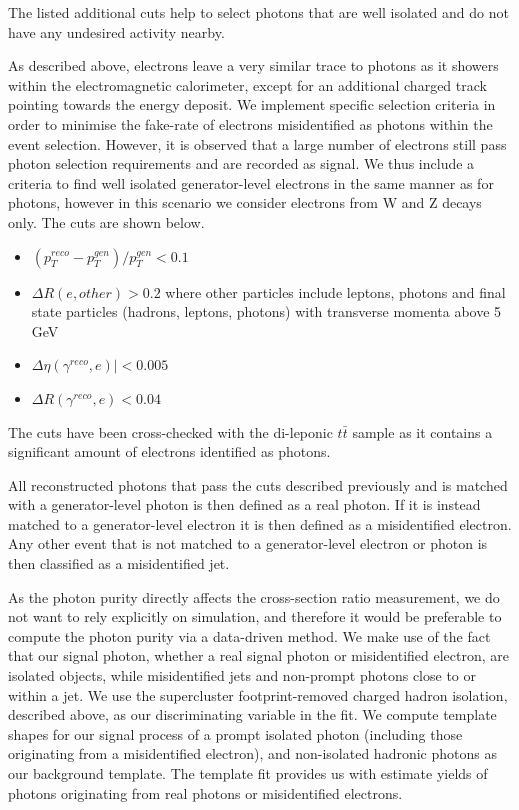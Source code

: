 The listed additional cuts help to select photons that are well isolated and do not have any undesired activity nearby.

As described above, electrons leave a very similar trace to photons as it showers within the electromagnetic calorimeter, except for an additional charged track pointing towards the energy deposit. We implement specific selection criteria in order to minimise the fake-rate of electrons misidentified as photons within the event selection. However, it is observed that a large number of electrons still pass photon selection requirements and are recorded as signal. We thus include a criteria to find well isolated generator-level electrons in the same manner as for photons, however in this scenario we consider electrons from W and Z decays only. The cuts are shown below.

\begin{itemize}
	\item $\left( p_T^{reco} - p_T^{gen} \right) /p_T^{gen} < 0.1$
	\item $\Delta R ( e, other ) > 0.2$ where other particles include leptons, photons and final state
		  particles (hadrons, leptons, photons) with transverse momenta above 5 GeV
	\item $ \Delta\eta ( \gamma^{reco}, e )| < 0.005$
	\item $\Delta R ( \gamma^{reco}, e ) < 0.04$
\end{itemize}

The cuts have been cross-checked with the di-leponic $t\bar{t}$ sample as it contains a significant amount of electrons identified as photons.

All reconstructed photons that pass the cuts described previously and is matched with a generator-level photon is then defined as a real photon. If it is instead matched to a generator-level electron it is then defined as a misidentified electron. Any other event that is not matched to a generator-level electron or photon is then classified as a misidentified jet.

As the photon purity directly affects the cross-section ratio measurement, we do not want to rely explicitly on simulation, and therefore it would be preferable to compute the photon purity via a data-driven method. We make use of the fact that our signal photon, whether a real signal photon or misidentified electron, are isolated objects, while misidentified jets and non-prompt photons close to or within a jet. We use the supercluster footprint-removed charged hadron isolation, described above, as our discriminating variable in the fit. We compute template shapes for our signal process of a prompt isolated photon (including those originating from a misidentified electron), and non-isolated hadronic photons as our background template. The template fit provides us with estimate yields of photons originating from real photons or misidentified electrons.   

